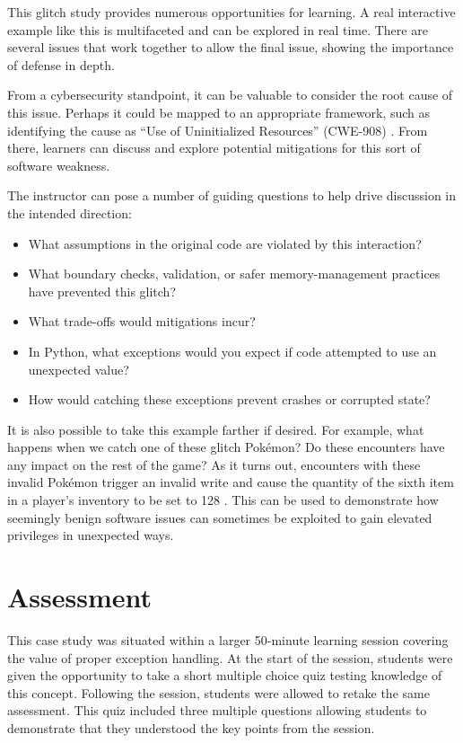 \documentclass[letterpaper]{article}
\begin{document}
This glitch study provides numerous opportunities for learning. A real interactive example like this is multifaceted and can be explored in real time. There are several issues that work together to allow the final issue, showing the importance of defense in depth.

From a cybersecurity standpoint, it can be valuable to consider the root cause of this issue. Perhaps it could be mapped to an appropriate framework, such as identifying the cause as ``Use of Uninitialized Resources'' (CWE-908) \cite{mitre2012}. From there, learners can discuss and explore potential mitigations for this sort of software weakness.

The instructor can pose a number of guiding questions to help drive discussion in the intended direction:

\begin{itemize}
    \item What assumptions in the original code are violated by this interaction?
    \item What boundary checks, validation, or safer memory-management practices have prevented this glitch?
    \item What trade-offs would mitigations incur?
    \item In Python, what exceptions would you expect if code attempted to use an unexpected value?
    \item How would catching these exceptions prevent crashes or corrupted state?
\end{itemize}

It is also possible to take this example farther if desired. For example, what happens when we catch one of these glitch Pokémon? Do these encounters have any impact on the rest of the game? As it turns out, encounters with these invalid Pokémon trigger an invalid write and cause the quantity of the sixth item in a player's inventory to be set to 128 \cite{bulbapedia2010}. This can be used to demonstrate how seemingly benign software issues can sometimes be exploited to gain elevated privileges in unexpected ways.

\section{Assessment}
This case study was situated within a larger 50-minute learning session covering the value of proper exception handling. At the start of the session, students were given the opportunity to take a short multiple choice quiz testing knowledge of this concept. Following the session, students were allowed to retake the same assessment. This quiz included three multiple questions allowing students to demonstrate that they understood the key points from the session.
\end{document}
